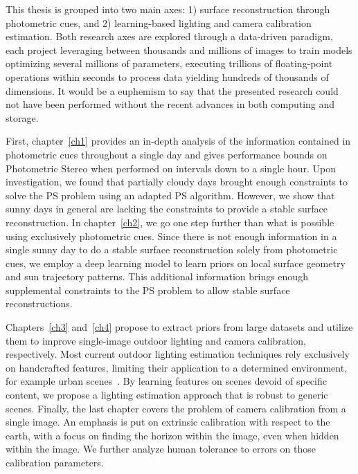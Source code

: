 This thesis is grouped into two main axes: 1) surface reconstruction through photometric cues, and 2) learning-based lighting and camera calibration estimation. Both research axes are explored through a data-driven paradigm, each project leveraging between thousands and millions of images to train models optimizing several millions of parameters, executing trillions of floating-point operations within seconds to process data yielding hundreds of thousands of dimensions. It would be a euphemism to say that the presented research could not have been performed without the recent advances in both computing and storage.

First, chapter~\ref{ch1} provides an in-depth analysis of the information contained in photometric cues throughout a single day and gives performance bounds on Photometric Stereo when performed on intervals down to a single hour. Upon investigation, we found that partially cloudy days brought enough constraints to solve the PS problem using an adapted PS algorithm. However, we show that sunny days in general are lacking the constraints to provide a stable surface reconstruction. In chapter~\ref{ch2}, we go one step further than what is possible using exclusively photometric cues. Since there is not enough information in a single sunny day to do a stable surface reconstruction solely from photometric cues, we employ a deep learning model to learn priors on local surface geometry and sun trajectory patterns. This additional information brings enough supplemental constraints to the PS problem to allow stable surface reconstructions.

Chapters~\ref{ch3} and~\ref{ch4} propose to extract priors from large datasets and utilize them to improve single-image outdoor lighting and camera calibration, respectively. Most current outdoor lighting estimation techniques rely exclusively on handcrafted features, limiting their application to a determined environment, for example urban scenes~\cite{lalonde-ijcv-12}. By learning features on scenes devoid of specific content, we propose a lighting estimation approach that is robust to generic scenes. Finally, the last chapter covers the problem of camera calibration from a single image. An emphasis is put on extrinsic calibration with respect to the earth, with a focus on finding the horizon within the image, even when hidden within the image. We further analyze human tolerance to errors on those calibration parameters.



%
%

